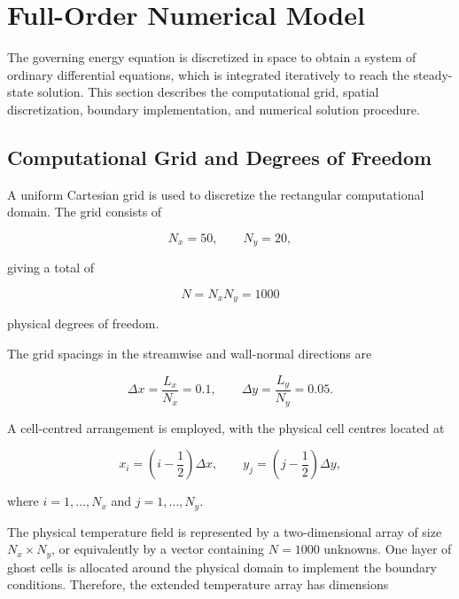 \section{Full-Order Numerical Model}

The governing energy equation is discretized in space to obtain
a system of ordinary differential equations, which is integrated
iteratively to reach the steady-state solution. This section
describes the computational grid, spatial discretization,
boundary implementation, and numerical solution procedure.

\subsection{Computational Grid and Degrees of Freedom}

A uniform Cartesian grid is used to discretize the rectangular
computational domain. The grid consists of

\begin{equation}
    N_x=50,
    \qquad
    N_y=20,
\end{equation}

giving a total of

\begin{equation}
    \boxed{N=N_xN_y=1000}
\end{equation}

physical degrees of freedom.

The grid spacings in the streamwise and wall-normal directions
are

\begin{equation}
    \Delta x=\frac{L_x}{N_x}=0.1,
    \qquad
    \Delta y=\frac{L_y}{N_y}=0.05.
\end{equation}

A cell-centred arrangement is employed, with the physical cell
centres located at

\begin{equation}
    x_i=\left(i-\frac{1}{2}\right)\Delta x,
    \qquad
    y_j=\left(j-\frac{1}{2}\right)\Delta y,
\end{equation}

where $i=1,\ldots,N_x$ and $j=1,\ldots,N_y$.

The physical temperature field is represented by a two-dimensional
array of size $N_x\times N_y$, or equivalently by a vector
containing $N=1000$ unknowns. One layer of ghost cells is
allocated around the physical domain to implement the boundary
conditions. Therefore, the extended temperature array has
dimensions

